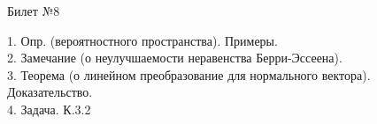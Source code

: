 \documentclass[preview]{standalone}
\begin{document}
 
\begin{center} {\Large Билет №8} \end{center} 

1.  Опр. (вероятностного пространства). Примеры.\\

2.  Замечание (о неулучшаемости неравенства Берри-Эссеена).\\

3.  Теорема (о линейном преобразование для нормального вектора). Доказательство.\\

4. Задача. К.3.2\\
\end{document}
